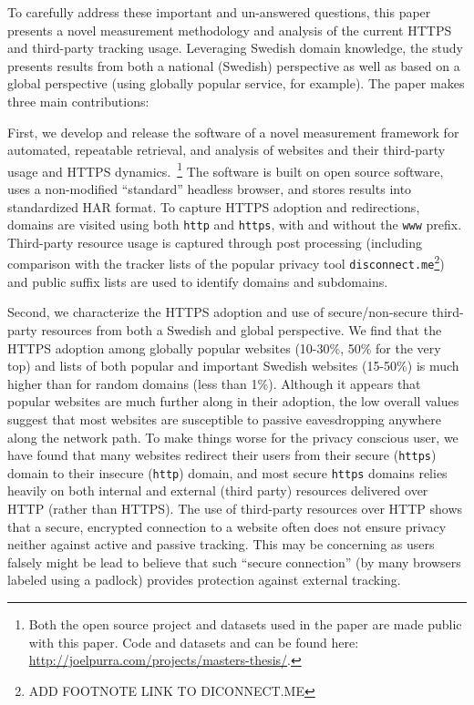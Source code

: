 \documentclass{sig-alternate-10pt}
\begin{document}
To carefully address these important and un-answered questions, this paper presents 
a novel measurement methodology and analysis of the current HTTPS and third-party tracking usage.  
Leveraging Swedish domain knowledge, the study presents results from both a national (Swedish) 
perspective as well as based on a global perspective (using globally popular service, for example).  
The paper makes three main contributions:

First, we develop and release the software of a novel measurement framework for automated, 
repeatable retrieval, and analysis of websites and their third-party usage and 
HTTPS dynamics.~\footnote{Both the open source project and datasets used in the paper 
are made public with this paper.   Code and datasets and can be found here: \url{http://joelpurra.com/projects/masters-thesis/}.}  
The software is built on open source software, uses a non-modified ``standard'' headless browser, 
and stores results into standardized HAR format.  To capture HTTPS adoption and redirections, 
domains are visited using both \texttt{http} and \texttt{https}, with and without the \texttt{www} prefix. 
Third-party resource usage is captured through post processing (including comparison with the tracker 
lists of the popular privacy tool \texttt{disconnect.me}\footnote{ADD FOOTNOTE LINK TO DICONNECT.ME}) 
and public suffix lists are used to identify domains and subdomains.

Second, we characterize the HTTPS adoption and use of secure/non-secure third-party resources from 
both a Swedish and global perspective.  We find that the HTTPS adoption among globally popular 
websites (10-30\%, 50\% for the very top) and lists of both popular and important Swedish 
websites (15-50\%) is much higher than for random domains (less than 1\%). Although it appears 
that popular websites are much further along in their adoption, the low overall values suggest 
that most websites are susceptible to passive eavesdropping anywhere along the network path.  
To make things worse for the privacy conscious user, we have found that many websites redirect 
their users from their secure (\texttt{https}) domain to their insecure (\texttt{http}) domain, 
and most secure \texttt{https} domains relies heavily on both internal and external (third party) 
resources delivered over HTTP (rather than HTTPS).  The use of third-party resources over HTTP 
shows that a secure, encrypted connection to a website often does not ensure privacy neither 
against active and passive tracking.  This may be concerning as users falsely might be lead to 
believe that such “secure connection” (by many browsers labeled using a padlock) provides 
protection against external tracking.
\end{document}
